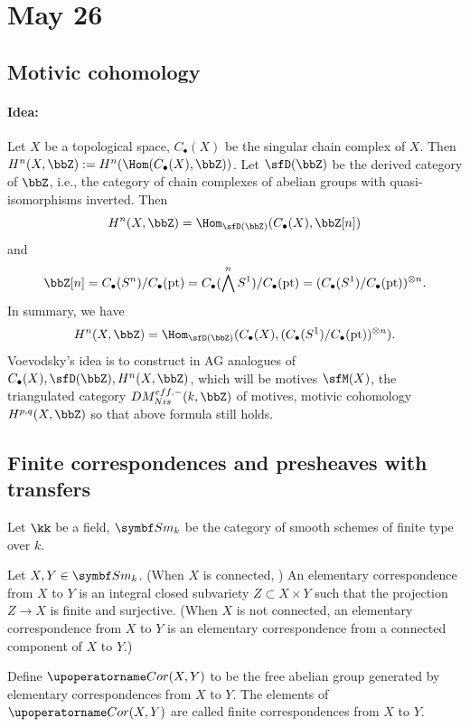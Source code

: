 \section{May 26}

\subsection{Motivic cohomology}

  \paragraph{Idea:} Let $X$ be a topological space, $C_\bullet(X)$ be the singular chain complex of $X$. 
  Then $H^n(X,\bbZ) := H^n(\Hom(C_\bullet(X),\bbZ))$.
  Let $\sfD(\bbZ)$ be the derived category of $\bbZ$, i.e., the category of chain complexes of abelian groups with quasi-isomorphisms inverted. 
  Then
  \[ H^n(X,\bbZ) = \Hom_{\sfD(\bbZ)}(C_\bullet(X),\bbZ[n]) \]
  and 
  \[ \bbZ[n] = C_\bullet(S^n)/C_\bullet(\mathrm{pt}) = C_{\bullet}(\bigwedge^n S^1)/C_\bullet(\mathrm{pt}) = (C_\bullet(S^1)/C_\bullet(\mathrm{pt}))^{\otimes n}. \]
  In summary, we have
  \[ H^n(X,\bbZ) = \Hom_{\sfD(\bbZ)}(C_\bullet(X), (C_\bullet(S^1)/C_\bullet(\mathrm{pt}))^{\otimes n}). \]
  Voevodsky's idea is to construct in AG analogues of $C_\bullet(X), \sfD(\bbZ), H^n(X,\bbZ)$, 
  which will be motives $\sfM(X)$, the triangulated category $DM_{Nis}^{eff,-}(k,\bbZ)$ of motives, motivic cohomology $H^{p,q}(X,\bbZ)$ so that above formula still holds.


\subsection{Finite correspondences and presheaves with transfers}

  Let $\kk$ be a field, $\Sm_k$ be the category of smooth schemes of finite type over $k$.

  \begin{definition}
    Let $X,Y\in \Sm_k$. 
    (When $X$ is connected, )
    An elementary correspondence from $X$ to $Y$ is an integral closed subvariety $Z\subset X\times Y$ such that the projection $Z\to X$ is finite and surjective.
    (When $X$ is not connected, an elementary correspondence from $X$ to $Y$ is an elementary correspondence from a connected component of $X$ to $Y$.)

    Define $\Cone(X,Y)$ to be the free abelian group generated by elementary correspondences from $X$ to $Y$. 
    The elements of $\Cone(X,Y)$ are called finite correspondences from $X$ to $Y$.
  \end{definition}

